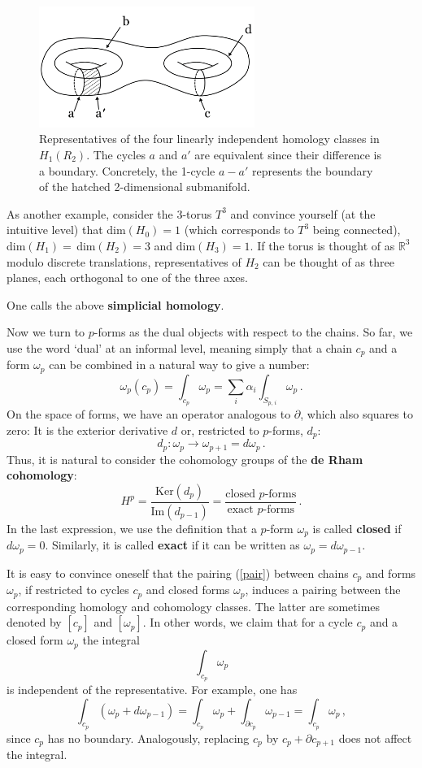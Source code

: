 \documentclass[12pt]{article}
\newcommand{\be}{\begin{equation}}
\newcommand{\ee}{\end{equation}}
\numberwithin{equation}{section}
\begin{document}
\begin{figure}[ht]
\begin{center} 
\includegraphics[width=7cm]{r2.png}
\caption{Representatives of the four linearly independent homology classes in $H_1(R_2)$. The cycles $a$ and $a'$ are equivalent since their difference is a boundary. Concretely, the 1-cycle $a-a'$ represents the boundary of the hatched 2-dimensional submanifold.}
\label{r2} 
\end{center}
\end{figure}

As another example, consider the 3-torus $T^3$ and convince yourself (at the intuitive level) that dim$(H_0)=1$ (which corresponds to $T^3$ being connected), 
dim$(H_1)=\,$dim$(H_2)=3$ and dim$(H_3)=1$. If the torus is thought of as $\mathbb{R}^3$ modulo discrete translations, representatives of $H_2$ can be thought of as three planes, each orthogonal to one of the three axes. 

One calls the above {\bf simplicial homology}.

Now we turn to $p$-forms as the dual objects with respect to the chains. So far, we use the word `dual' at an informal level, meaning simply that a chain $c_p$ and a form $\omega_p$ can be combined in a natural way to give a number:
\be
\omega_p(c_p)=\int_{c_p}\omega_p=\sum_i\alpha_i\int_{S_{p,\,i}}\omega_p\,.
\label{pair}
\ee
On the space of forms, we have an operator analogous to $\partial$, which also squares to zero: It is the exterior derivative $d$ or, restricted to $p$-forms, $d_p$:
\be
d_p: \omega_p\to \omega_{p+1}=d\omega_p\,.
\ee
Thus, it is natural to consider the cohomology groups of the {\bf de Rham cohomology}:
\be
H^p=\frac{\mbox{Ker}(d_p)}{\mbox{Im}(d_{p-1})}=\frac{\mbox{closed $p$-forms}}{\mbox{exact $p$-forms}}\,.
\ee
In the last expression, we use the definition that a $p$-form $\omega_p$ is called {\bf closed} if $d\omega_p=0$. Similarly, it is called {\bf exact} if it can be written as $\omega_p=d\omega_{p-1}$.

It is easy to convince oneself that the pairing (\ref{pair}) between chains $c_p$ and forms $\omega_p$, if restricted to cycles $c_p$ and closed forms $\omega_p$, induces a pairing between the corresponding homology and cohomology classes. The latter are sometimes denoted by $[c_p]$ and $[\omega_p]$. In other words, we claim that for a cycle $c_p$ and a closed form $\omega_p$ the integral
\be
\int_{c_p}\omega_p
\ee
is independent of the representative. For example, one has
\be
\int_{c_p}(\omega_p+d\omega_{p-1})=\int_{c_p}\omega_p+\int_{\partial c_p}\omega_{p-1}=\int_{c_p}\omega_p\,,
\ee
since $c_p$ has no boundary. Analogously, replacing $c_p$ by $c_p+\partial c_{p+1}$ does not affect the integral. 
\end{document}
